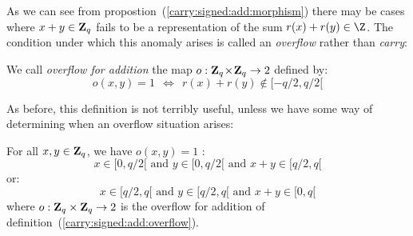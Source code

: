 \documentclass{article}
\newcommand{\zq}{\mbox{${\bf Z}_{q}$}}
\begin{document}
As we can see from propostion~(\ref{carry:signed:add:morphism}) there 
may be cases where $x+y\in\zq$ fails to be a representation of the sum
$r(x)+r(y)\in\Z$. The condition under which this anomaly arises is 
called an {\em overflow} rather than {\em carry}:

\begin{defin}\label{carry:signed:add:overflow}
We call {\em overflow for addition} the map $o:\zq\!\times\!\zq\rightarrow2$ defined by:
  \[
    o(x,y) = 1  \ \ \Leftrightarrow\ \ r(x)+r(y)\not\in[-q/2,q/2[
  \]
\end{defin}

As before, this definition is not terribly useful, unless we have some way
of determining when an overflow situation arises:

\begin{prop}\label{carry:signed:add:criterium}
  For all $x,y\in\zq$, we have $o(x,y)=1$ \ifand:
  \[
    x\in[0,q/2[\mbox{\ and\ }y\in[0,q/2[\mbox{\ and\ }x+y\in[q/2,q[
  \]
or:
  \[
    x\in[q/2,q[\mbox{\ and\ }y\in[q/2,q[\mbox{\ and\ }x+y\in[0,q[
  \]
where $o:\zq\times\zq\rightarrow 2$ is the overflow for addition of 
  definition~(\ref{carry:signed:add:overflow}).
\end{prop}
\end{document}
